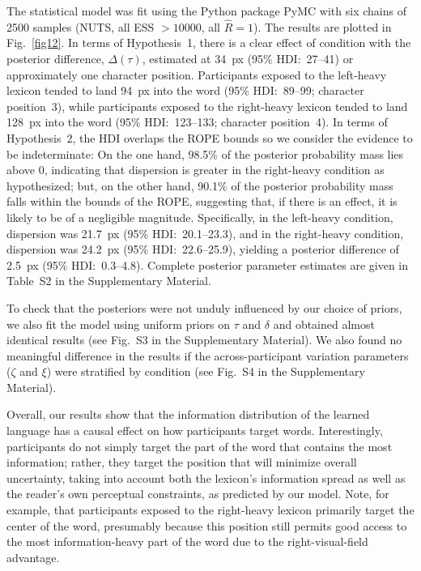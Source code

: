 \documentclass[doc,biblatex]{apa7}
\begin{document}
The statistical model was fit using the Python package PyMC with six chains of 2500 samples (NUTS, all ESS $> 10000$, all $\hat{R}=1$). The results are plotted in Fig.~\ref{fig12}. In terms of Hypothesis~1, there is a clear effect of condition with the posterior difference, $\Delta(\tau)$, estimated at 34~px (95\% HDI:~27--41) or approximately one character position. Participants exposed to the left-heavy lexicon tended to land 94~px into the word (95\% HDI:~89--99; character position~3), while participants exposed to the right-heavy lexicon tended to land 128~px into the word (95\% HDI:~123--133; character position~4). In terms of Hypothesis~2, the HDI overlaps the ROPE bounds so we consider the evidence to be indeterminate: On the one hand, 98.5\% of the posterior probability mass lies above 0, indicating that dispersion is greater in the right-heavy condition as hypothesized; but, on the other hand, 90.1\% of the posterior probability mass falls within the bounds of the ROPE, suggesting that, if there is an effect, it is likely to be of a negligible magnitude. Specifically, in the left-heavy condition, dispersion was 21.7~px (95\% HDI:~20.1--23.3), and in the right-heavy condition, dispersion was 24.2~px (95\% HDI:~22.6--25.9), yielding a posterior difference of 2.5~px (95\% HDI:~0.3--4.8). Complete posterior parameter estimates are given in Table~S2 in the Supplementary Material.

To check that the posteriors were not unduly influenced by our choice of priors, we also fit the model using uniform priors on $\tau$ and $\delta$ and obtained almost identical results (see Fig.~S3 in the Supplementary Material). We also found no meaningful difference in the results if the across-participant variation parameters ($\zeta$ and $\xi$) were stratified by condition (see Fig.~S4 in the Supplementary Material).

Overall, our results show that the information distribution of the learned language has a causal effect on how participants target words. Interestingly, participants do not simply target the part of the word that contains the most information; rather, they target the position that will minimize overall uncertainty, taking into account both the lexicon's information spread as well as the reader's own perceptual constraints, as predicted by our model. Note, for example, that participants exposed to the right-heavy lexicon primarily target the center of the word, presumably because this position still permits good access to the most information-heavy part of the word due to the right-visual-field advantage.
\end{document}
